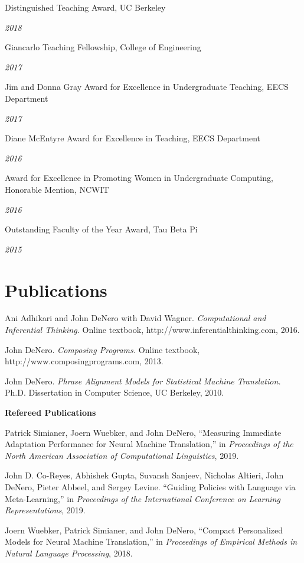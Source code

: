 \documentclass[margin,line]{res}
\newcommand{\dated}[2]{\parbox[t]{4.4in}{#1} \hspace{0.4in}
											 \parbox[t]{1in}{ {\it #2 } } }
\begin{document}
\begin{resume}
\dated{Distinguished Teaching Award, UC Berkeley} { 2018 }

\dated{Giancarlo Teaching Fellowship, College of Engineering} { 2017 }

\dated{Jim and Donna Gray Award for Excellence in Undergraduate Teaching, EECS Department} { 2017 }

\dated{Diane McEntyre Award for Excellence in Teaching, EECS Department} { 2016 }

\dated{Award for Excellence in Promoting Women in Undergraduate Computing, Honorable Mention, NCWIT} { 2016 }

%
\dated{Outstanding Faculty of the Year Award, Tau Beta Pi} { 2015 }

%
%
%

\section{\sc Publications}

Ani Adhikari and John DeNero with David Wagner. {\it Computational and
Inferential Thinking.} Online textbook, http://www.inferentialthinking.com,
2016.

John DeNero. {\it Composing Programs.} Online textbook,
http://www.composingprograms.com, 2013.

John DeNero. {\it Phrase Alignment Models for Statistical Machine Translation.}
Ph.D. Dissertation in Computer Science, UC Berkeley, 2010.

{\bf Refereed Publications }

Patrick Simianer, Joern Wuebker, and John DeNero, ``Measuring Immediate Adaptation Performance for Neural Machine Translation,'' in {\it Proceedings of the North American Association of Computational Linguistics}, 2019.

John D. Co-Reyes, Abhishek Gupta, Suvansh Sanjeev, Nicholas Altieri, John DeNero, Pieter Abbeel, and Sergey Levine. ``Guiding Policies with Language via Meta-Learning,'' in {\it Proceedings of the International Conference on Learning Representations}, 2019.

Joern Wuebker, Patrick Simianer, and John DeNero, ``Compact Personalized Models for Neural Machine Translation,'' in {\it Proceedings of Empirical Methods in Natural Language Processing}, 2018.


\end{resume}
\end{document}
